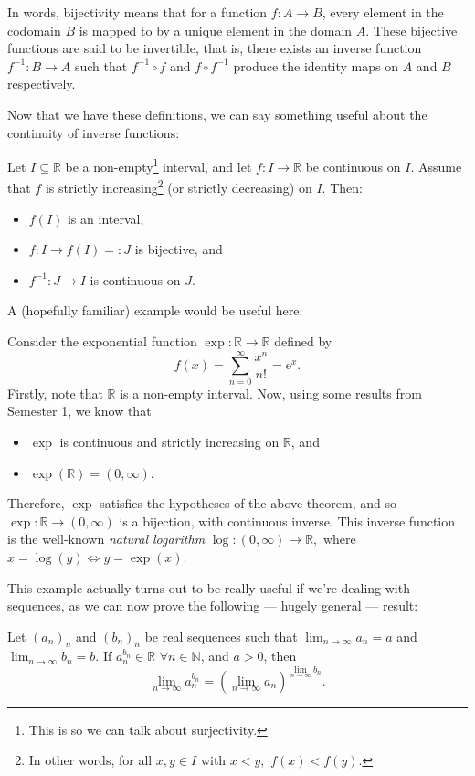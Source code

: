 \documentclass[
  12pt,
  a4paper]{extarticle}
\providecommand{\tightlist}{%
  \setlength{\itemsep}{0pt}\setlength{\parskip}{0pt}}
\theoremstyle{plain}
\theoremstyle{definition}
\theoremstyle{plain}
\theoremstyle{plain}
\theoremstyle{plain}
\theoremstyle{plain}
\theoremstyle{definition}
\theoremstyle{definition}
\theoremstyle{remark}
\theoremstyle{remark}
\let\BeginKnitrBlock\begin \let\EndKnitrBlock\end
\renewcommand{\;}{\,}
\begin{document}
In words, bijectivity means that for a function \(f:A \to B\), every element in the codomain \(B\) is mapped to by a unique element in the domain \(A\). These bijective functions are said to be invertible, that is, there exists an inverse function \(f^{-1}: B \to A\) such that \(f^{-1} \circ f\) and \(f \circ f^{-1}\) produce the identity maps on \(A\) and \(B\) respectively.

Now that we have these definitions, we can say something useful about the continuity of inverse functions:

\BeginKnitrBlock{theorem}
{\label{thm:thm1} }Let \(I \subseteq \mathbb{R}\) be a non-empty\footnote{This is so we can talk about surjectivity.} interval, and let \(f: I \to \mathbb{R}\) be continuous on \(I\). Assume that \(f\) is strictly increasing\footnote{In other words, for all \(x,y \in I\) with \(x < y,\) \(f(x) < f(y)\).} (or strictly decreasing) on \(I\). Then:

\begin{itemize}
\tightlist
\item
  \(f(I)\) is an interval,
\item
  \(f : I \to f(I) =: J\) is bijective, and
\item
  \(f^{-1}: J \to I\) is continuous on \(J\).
\end{itemize}
\EndKnitrBlock{theorem}

A (hopefully familiar) example would be useful here:

\BeginKnitrBlock{example}
{\label{exm:unnamed-chunk-2} }Consider the exponential function \(\exp:\mathbb{R} \to \mathbb{R}\) defined by \[f(x)  = \sum_{n = 0}^{\infty} \frac{x^n}{n!} = \mathrm{e}^x.\] Firstly, note that \(\mathbb{R}\) is a non-empty interval. Now, using some results from Semester 1, we know that

\begin{itemize}
\tightlist
\item
  \(\exp\) is continuous and strictly increasing on \(\mathbb{R}\), and
\item
  \(\exp(\mathbb{R}) = (0,\infty)\).
\end{itemize}

Therefore, \(\exp\) satisfies the hypotheses of the above theorem, and so \(\exp: \mathbb{R} \to (0, \infty)\) is a bijection, with continuous inverse. This inverse function is the well-known \emph{natural logarithm} \(\log: (0,\infty) \to \mathbb{R},\) where \(x = \log(y) \iff y = \exp(x).\)
\EndKnitrBlock{example}

This example actually turns out to be really useful if we're dealing with sequences, as we can now prove the following --- hugely general --- result:
\BeginKnitrBlock{proposition}
{\label{prp:prop1} }Let \((a_n)_n\) and \((b_n)_n\) be real sequences such that \(\lim_{n\to\infty}a_n = a\) and \(\lim_{n\to\infty}b_n = b\). If \(a_n^{b_n} \in \mathbb{R}\;\; \forall n \in \mathbb{N}\), and \(a>0\), then \[\lim_{n \to \infty} a_n^{b_n} = \left(\lim_{n\to\infty} a_n\right)^{\lim_{n\to\infty}b_n}.\]
\EndKnitrBlock{proposition}
\end{document}
